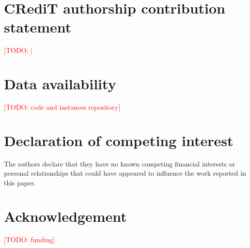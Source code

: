 \documentclass[preprint,review,12pt,authoryear]{elsarticle}
\newcommand{\todo}[1]{\textcolor{red}{[TODO: #1]}}
\begin{document}
\section*{CRediT authorship contribution statement}
\todo{}

\section*{Data availability}
\todo{code and instances repository}

\section*{Declaration of competing interest}
The authors declare that they have no known competing financial interests or personal relationships that could
have appeared to influence the work reported in this paper.

\section*{Acknowledgement}
\todo{funding}

\appendix
\end{document}
